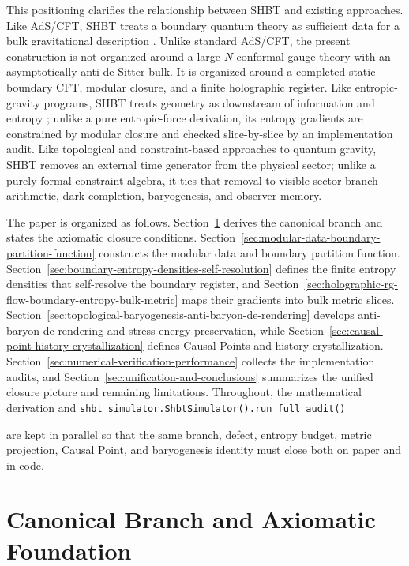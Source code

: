 \documentclass[11pt]{article}
\DeclareRobustCommand{\pyvar}[1]{%
  \ifmmode\text{\nolinkurl{#1}}\else\nolinkurl{#1}\fi%
}
\begin{document}
This positioning clarifies the relationship between SHBT and existing
approaches.  Like AdS/CFT, SHBT treats a boundary quantum theory as sufficient
data for a bulk gravitational description \cite{maldacena1998,gkp1998,witten1998}.
Unlike standard AdS/CFT, the present construction is not organized around a
large-$N$ conformal gauge theory with an asymptotically anti-de Sitter bulk.  It
is organized around a completed static boundary CFT, modular closure, and a
finite holographic register.  Like entropic-gravity programs, SHBT treats
geometry as downstream of information and entropy \cite{verlinde2011}; unlike a
pure entropic-force derivation, its entropy gradients are constrained by modular
closure and checked slice-by-slice by an implementation audit.  Like
topological and constraint-based approaches to quantum gravity, SHBT removes an
external time generator from the physical sector; unlike a purely formal
constraint algebra, it ties that removal to visible-sector branch arithmetic,
dark completion, baryogenesis, and observer memory.

The paper is organized as follows.  Section~\ref{sec:canonical-branch-axiomatic-foundation}
derives the canonical branch and states the axiomatic closure conditions.
Section~\ref{sec:modular-data-boundary-partition-function} constructs the
modular data and boundary partition function.  Section~\ref{sec:boundary-entropy-densities-self-resolution}
defines the finite entropy densities that self-resolve the boundary register,
and Section~\ref{sec:holographic-rg-flow-boundary-entropy-bulk-metric} maps
their gradients into bulk metric slices.  Section~\ref{sec:topological-baryogenesis-anti-baryon-de-rendering}
develops anti-baryon de-rendering and stress-energy preservation, while
Section~\ref{sec:causal-point-history-crystallization} defines Causal Points
and history crystallization.  Section~\ref{sec:numerical-verification-performance}
collects the implementation audits, and Section~\ref{sec:unification-and-conclusions}
summarizes the unified closure picture and remaining limitations.  Throughout,
the mathematical derivation and \pyvar{shbt_simulator.ShbtSimulator().run_full_audit()}
are kept in parallel so that the same branch, defect, entropy budget, metric
projection, Causal Point, and baryogenesis identity must close both on paper and
in code.

\section{Canonical Branch and Axiomatic Foundation}
\label{sec:canonical-branch-axiomatic-foundation}
\end{document}
